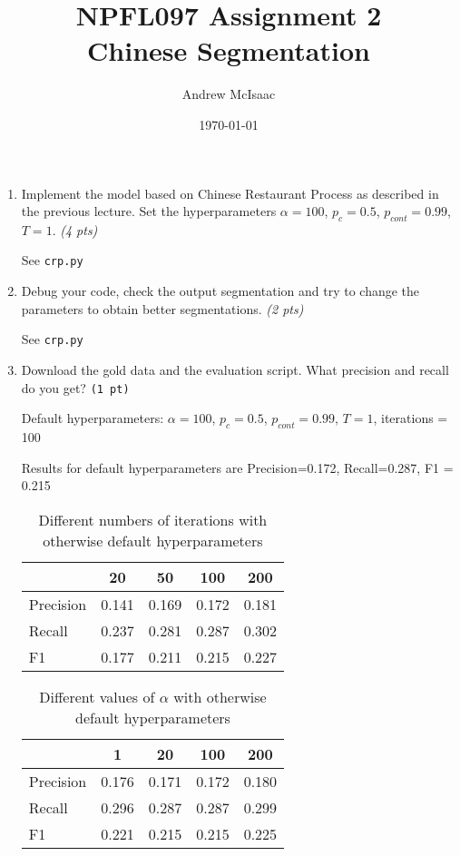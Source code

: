 \documentclass[a4paper]{article}
\title{NPFL097 Assignment 2\\Chinese Segmentation}
\date{\today}
\author{Andrew McIsaac}
\begin{document}
\maketitle

\begin{enumerate}
	\item Implement the model based on Chinese Restaurant Process as described
		in the previous lecture. Set the hyperparameters $\alpha = 100$,
		$p_c = 0.5$, $p_{cont} = 0.99$, $T = 1$. \textit{(4 pts)}

		See \texttt{crp.py}

	\item Debug your code, check the output segmentation and try to change the
		parameters to obtain better segmentations. \textit{(2 pts)}

		See \texttt{crp.py}

	\item Download the gold data and the evaluation script. What precision and
		recall do you get? \texttt{(1 pt)}

        Default hyperparameters: $\alpha = 100$, $p_c = 0.5$, $p_{cont} = 0.99$,
        $T = 1$, iterations = 100

        Results for default hyperparameters are Precision=0.172, Recall=0.287,
        F1 = 0.215

        \begin{table}[H]
            \centering
            \caption{Different numbers of iterations with otherwise default
            hyperparameters}
            \label{tab:iterations}
            \begin{tabular}{l|c|c|c|c}
             & 20 & 50 & 100 & 200 \\
             \hline
                Precision & 0.141 & 0.169 & 0.172 & 0.181 \\
                Recall & 0.237 & 0.281 & 0.287 & 0.302 \\
                F1 & 0.177 & 0.211 & 0.215 & 0.227 \\
            \end{tabular}
        \end{table}

		\begin{table}[H]
			\centering
			\caption{Different values of $\alpha$ with otherwise default
			hyperparameters}
			\label{tab:alpha}
			\begin{tabular}{l|c|c|c|c}
				& 1 & 20 & 100 & 200 \\
				\hline
				Precision & 0.176 & 0.171 & 0.172 & 0.180 \\
				Recall & 0.296 & 0.287 & 0.287 & 0.299 \\
				F1 & 0.221 & 0.215 & 0.215 & 0.225 \\
			\end{tabular}
		\end{table}
		

\end{enumerate}
\end{document}
